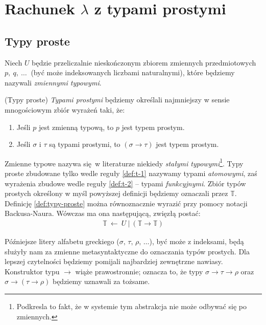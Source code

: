 \section{Rachunek \(\lambda\) z typami prostymi}\label{sec:simple_types}
\subsection{Typy proste}\label{ssec:typy-proste}
Niech \(U\) będzie przeliczalnie nieskończonym zbiorem zmiennych przedmiotowych \(p,\ q,\ \dots\ \) (być może indeksowanych liczbami naturalnymi), które będziemy nazywali \emph{zmiennymi typowymi}.

\begin{definicja}\label{def:typy-proste}(Typy proste)
\emph{Typami prostymi} będziemy określali najmniejszy w sensie mnogościowym zbiór wyrażeń taki, że:
\begin{enumerate}[label=(S\arabic*)]
  \setlength\itemsep{0em}
  \item Jeśli \(p\) jest zmienną typową, to \(p\) jest typem prostym.\label{def:t-1}
  \item Jeśli \(\sigma\) i \(\tau\) są typami prostymi, to \(\left(\sigma\to\tau\right)\) jest typem prostym.\label{def:t-2}
\end{enumerate}
\end{definicja}

Zmienne typowe nazywa się w literaturze niekiedy \emph{stałymi typowymi}\footnote{Podkresla to fakt, że w systemie tym abstrakcja nie może odbywać się po zmiennych.}. Typy proste zbudowane tylko wedle reguły \ref{def:t-1} nazywamy typami \emph{atomowymi}, zaś wyrażenia zbudowe wedle reguły \ref{def:t-2} -- typami \emph{funkcyjnymi}. Zbiór typów prostych określony w myśl powyższej definicji będziemy oznaczali przez \(\mathbb{T}\). Definicję \ref{def:typy-proste} można równoznacznie wyrazić przy pomocy notacji Backusa-Naura. Wówczas ma ona następującą, zwięzłą postać:
\begin{align*}
  \mathbb{T}\ \leftarrow \ U\ |\ (\mathbb{T}\to\mathbb{T})
\end{align*}

Późniejsze litery alfabetu greckiego (\(\sigma,\, \tau,\, \rho,\,\dots\)), być może z indeksami, będą służyły nam za zmienne metasyntaktyczne do oznaczania typów prostych. Dla lepszej czytelności będziemy pomijali najbardziej zewnętrzne nawiasy. Konstruktor typu \(\to\) wiąże prawostronnie; oznacza to, że typy \(\sigma\to\tau\to\rho\) oraz \(\sigma\to(\tau\to\rho)\) będziemy uznawali za tożsame.

